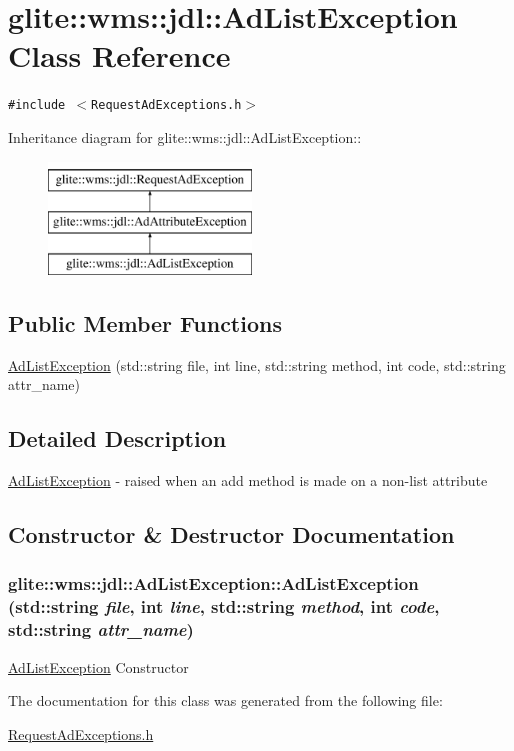 \hypertarget{classglite_1_1wms_1_1jdl_1_1AdListException}{
\section{glite::wms::jdl::Ad\-List\-Exception Class Reference}
\label{classglite_1_1wms_1_1jdl_1_1AdListException}
}
{\tt \#include $<$Request\-Ad\-Exceptions.h$>$}

Inheritance diagram for glite::wms::jdl::Ad\-List\-Exception::\begin{figure}[H]
\begin{center}
\leavevmode
\includegraphics[height=3cm]{classglite_1_1wms_1_1jdl_1_1AdListException}
\end{center}
\end{figure}
\subsection*{Public Member Functions}
\begin{CompactItemize}
\item 
\hyperlink{classglite_1_1wms_1_1jdl_1_1AdListException_a0}{Ad\-List\-Exception} (std::string file, int line, std::string method, int code, std::string attr\_\-name)
\end{CompactItemize}


\subsection{Detailed Description}
\hyperlink{classglite_1_1wms_1_1jdl_1_1AdListException}{Ad\-List\-Exception} - raised when an add method is made on a non-list attribute 



\subsection{Constructor \& Destructor Documentation}
\hypertarget{classglite_1_1wms_1_1jdl_1_1AdListException_a0}{
\subsubsection[AdListException]{\setlength{\rightskip}{0pt plus 5cm}glite::wms::jdl::Ad\-List\-Exception::Ad\-List\-Exception (std::string {\em file}, int {\em line}, std::string {\em method}, int {\em code}, std::string {\em attr\_\-name})}}
\label{classglite_1_1wms_1_1jdl_1_1AdListException_a0}


\hyperlink{classglite_1_1wms_1_1jdl_1_1AdListException}{Ad\-List\-Exception} Constructor 

The documentation for this class was generated from the following file:\begin{CompactItemize}
\item 
\hyperlink{RequestAdExceptions_8h}{Request\-Ad\-Exceptions.h}\end{CompactItemize}
